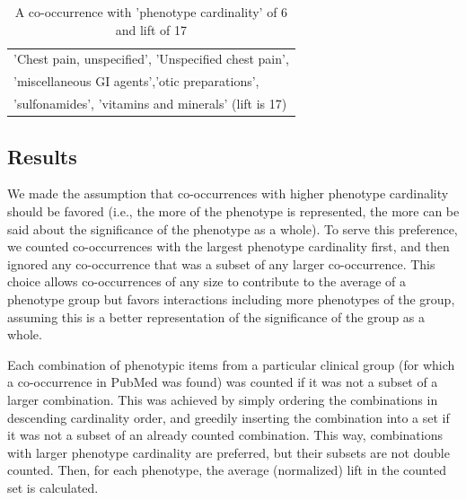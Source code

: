 \documentclass{sig-alternate-05-2015}
\begin{document}
\begin{table}
\begin{center}
\begin{tabular}{l}
\toprule
'Chest pain, unspecified', 'Unspecified chest pain',\\
 'miscellaneous GI agents','otic preparations',\\
 'sulfonamides', 'vitamins and minerals' (lift is 17) \\
\bottomrule
\end{tabular}
\end{center}
\caption{A co-occurrence with 'phenotype cardinality' of 6 and lift of 17}
\label{tab:phenoCard}
\end{table}

\subsection{Results}

We made the assumption that co-occurrences with higher phenotype cardinality should be favored (i.e., the more of the phenotype is represented, the more can be said about the significance of the phenotype as a whole). 
To serve this preference, we counted co-occurrences with the largest phenotype cardinality first, and then ignored any co-occurrence that was a subset of any larger co-occurrence. 
This choice allows co-occurrences of any size to contribute to the average of a phenotype group but favors interactions including more phenotypes of the group, assuming this is a better representation of the significance of the group as a whole.

Each combination of phenotypic items from a particular clinical group (for which a co-occurrence in PubMed was found) was counted if it was not a subset of a larger combination. 
This was achieved by simply ordering the combinations in descending cardinality order, and greedily inserting the combination into a set if it was not a subset of an already counted combination. 
This way, combinations with larger phenotype cardinality are preferred, but their subsets are not double counted. Then, for each phenotype, the average (normalized) lift in the counted set is calculated.
\end{document}
